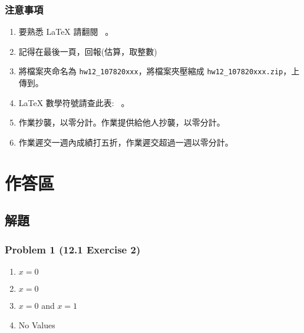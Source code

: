 \documentclass[12pt,hyperref={bookmarks=false}]{beamer}
\begin{document}
	\begin{frame}
	\frametitle{注意事項}
	\fontsize{10}{10pt}\selectfont
	\begin{enumerate}[label=(\alph*)]
	\item 要熟悉 LaTeX 請翻閱 \ 。
	\item 記得在最後一頁，回報\selectfont \color{red}{完成作業小時數}(估算，取整數)\selectfont \color{black}{。}
	\item 將檔案夾命名為 \texttt{hw12\_107820xxx}，將檔案夾壓縮成 \texttt{hw12\_107820xxx.zip}，上傳到。
	\item LaTeX 數學符號請查此表: \ 。
	\item 作業抄襲，以零分計。作業提供給他人抄襲，以零分計。
	\item 作業遲交一週內成績打五折，作業遲交超過一週以零分計。
	\end{enumerate}
	\end{frame}

\section{作答區}

	\subsection{解題}

	\begin{frame}
	\frametitle{Problem 1 (12.1 Exercise 2)}
	\fontsize{12}{16pt}\selectfont
	\begin{enumerate}[label=(\alph*)]
	\setlength\itemsep{0em}
	\item $x = 0$
	\item $x=0$
	\item $x=0$ and $x=1$
	\item No Values
	\end{enumerate}
	\end{frame}
\end{document}
